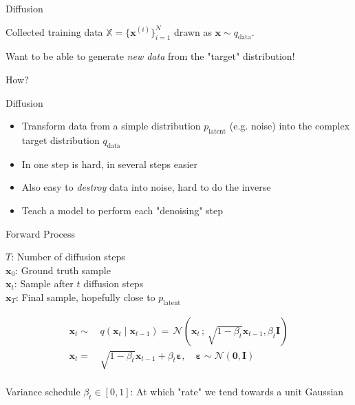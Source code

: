 \documentclass{beamer}
\begin{document}

\begin{frame}{Diffusion}

Collected training data $\mathbb{X} = \{ \bm{x}^{(i)} \}_{i=1}^N$ drawn as $\bm{x} \sim q_{\text{data}}$.

\vspace{0.5cm}
\pause
Want to be able to generate \textit{new data} from the "target" distribution!

\vspace{0.5cm}
\pause
How?

\end{frame}


\begin{frame}{Diffusion}

    \begin{itemize}
        \setlength\itemsep{1.5em}
        \item Transform data from a simple distribution $p_{\text{latent}}$ (e.g. noise) into the complex target distribution $q_{\text{data}}$
        \pause
        \item In one step is hard, in several steps easier
        \pause
        \item Also easy to \textit{destroy} data into noise, hard to do the inverse
        \pause
        \item Teach a model to perform each "denoising" step
    \end{itemize}

\end{frame}


\begin{frame}{Forward Process}

$T$: Number of diffusion steps \\
\pause
$\bm{x}_0$: Ground truth sample \\
\pause
$\bm{x}_t$: Sample after $t$ diffusion steps \\
\pause
$\bm{x}_T$: Final sample, hopefully close to $p_{\text{latent}}$ \\

\vspace{0.6cm}

\pause

\begin{align*}
\bm{x}_t \sim & \, q(\bm{x}_t \mid \bm{x}_{t-1}) = \, \mathcal{N}(\bm{x}_t \, ; \, \sqrt{1 - \beta_t} \bm{x}_{t-1}, \beta_t \bm{I}) \\
\bm{x}_t = & \, \sqrt{1 - \beta_t} \bm{x}_{t-1} + \beta_t \bm{\varepsilon}, \quad \bm{\varepsilon} \sim \mathcal{N}(\bm{0}, \bm{I}) \\
\end{align*}

\vspace{0.6cm}

\pause

Variance schedule $\beta_t \in [0, 1]$: At which "rate" we tend towards a unit Gaussian

\end{frame}
\end{document}
